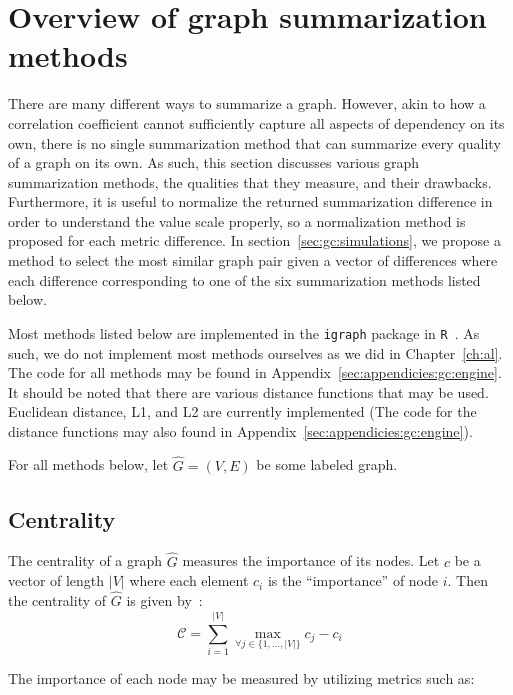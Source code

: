 \section{Overview of graph summarization methods}
\label{sec:gc:methods}

There are many different ways to summarize a graph. However, akin to how a
correlation coefficient cannot sufficiently capture all aspects of dependency 
on its own, there is no single summarization method that can summarize 
every quality of a graph on its own. As such, this section discusses various 
graph summarization methods, the qualities that they measure, and their 
drawbacks. Furthermore, it is useful to normalize the returned 
summarization difference in order to understand the value scale properly, so a 
normalization method is proposed for each metric difference. 
In section~\ref{sec:gc:simulations}, we propose a method to select the most 
similar graph pair given a vector of differences where each difference 
corresponding to one of the six summarization methods listed below.

Most methods listed below are implemented in the \texttt{igraph} package in 
\texttt{R}~\cite{igraph}. As such, we do not implement most methods ourselves 
as we did in Chapter~\ref{ch:al}. The code for 
all methods may be found in Appendix~\ref{sec:appendicies:gc:engine}. It should 
be noted that there are various distance functions that may be used. 
Euclidean distance, L1, and L2 are currently implemented (The code for the 
distance functions may also found in Appendix~\ref{sec:appendicies:gc:engine}). 

For all methods below, let $\hat{G}=(V,E)$ be some labeled graph.

\subsection{Centrality}
\label{sec:gc:methods:centrality}

The centrality of a graph $\hat{G}$ measures the importance of its 
nodes. Let $c$ be a vector of length $|V|$ where each element 
$c_i$ is the ``importance'' of node $i$. Then the centrality of $\hat{G}$ is 
given by~\cite{igraph}:
$$\mathcal{C} = \sum\limits^{|V|}_{i=1} \max_{\forall j \in \{1,...,|V|\}} 
c_j - c_i$$

\noindent The importance of each node may be measured by utilizing metrics such 
as:

